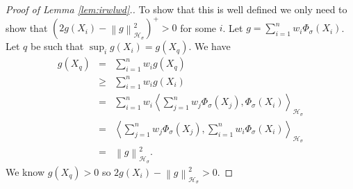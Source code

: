 \documentclass{article} %
\def\hsig{{\mathcal{H}_\sigma}}
\def\fm{{\Phi_\sigma}} %
\def\l{\left}
\def\r{\right}
\theoremstyle{definition}
\begin{document}
\begin{proof}[Proof of Lemma \ref{lem:irwlwd}.]
	To show that this is well defined we only need to show that $\left( 2g\left( X_i \right) - \l\|g\r\|_\hsig^2 \right)^+ >0$ for some $i$. Let $g = \sum_{i=1}^n w_i \fm\left( X_i \right)$. Let $q$ be such that $\sup_i g\l(X_i\r) = g\left( X_q \right)$. We have
	\begin{eqnarray*}
		g\left( X_q \right) 
		&=&\sum_{i=1}^n w_i g\left( X_q \right)\\
		&\ge&\sum_{i=1}^n w_i g\left( X_i \right)\\
		&=&\sum_{i=1}^n w_i \l<\sum_{j=1}^n w_j \fm\left( X_j \right), \fm \left( X_i \right)\r>_\hsig \\
		&=& \l<\sum_{j=1}^n w_j \fm\left( X_j \right), \sum_{i=1}^n w_i\fm \left( X_i \right)\r>_\hsig \\
		&=& \l\|g\r\|^2_\hsig.
	\end{eqnarray*}
	We know $g\left( X_q \right) >0$ so $2g\left( X_i \right) - \l\|g\r\|_\hsig^2>0$.
\end{proof}



\end{document}
